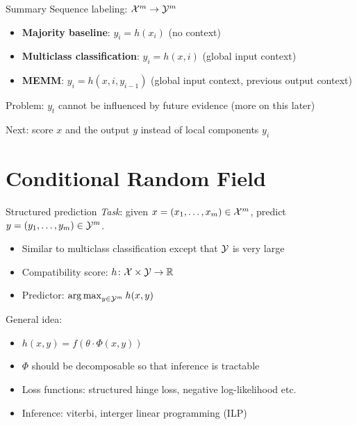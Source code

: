 \documentclass[usenames,dvipsnames,notes]{beamer}
\begin{document}
\begin{frame}
    {Summary}
    Sequence labeling: $\mathcal{X}^m \rightarrow \mathcal{Y}^m$
    \begin{itemize}
        \item \textbf{Majority baseline}: $y_i = h(x_i)$ (no context)
        \item \textbf{Multiclass classification}: $y_i = h(x, i)$ (global input context)
        \item \textbf{MEMM}: $y_i = h(x, i, y_{i-1})$ (global input context, previous output context)
    \end{itemize}

    Problem: $y_t$ cannot be influenced by future evidence (more on this later)

    Next: score $x$ and the output $y$ instead of local components $y_i$ 
\end{frame}

\section{Conditional Random Field}

\begin{frame}
    {Structured prediction}
    \emph{Task}: given $x=(x_1,\ldots,x_m) \in \mathcal{X}^m$, predict
    $y=(y_1,\ldots,y_m) \in \mathcal{Y}^m$.

    \begin{itemize}
        \item Similar to multiclass classification except that $\mathcal{Y}$ is very large
        \item Compatibility score: $h\colon \mathcal{X} \times \mathcal{Y} \rightarrow \mathbb{R}$
        \item Predictor: $\operatorname*{arg\,max}_{y\in\mathcal{Y}^m} h(x,y)$
    \end{itemize}

    General idea:\\
    \begin{itemize}
        \item $h(x,y) = f(\theta\cdot\Phi(x,y))$
        \item $\Phi$ should be decomposable so that inference is tractable
        \item Loss functions: structured hinge loss, negative log-likelihood etc.
        \item Inference: viterbi, interger linear programming (ILP) 
    \end{itemize}
\end{frame}
\end{document}
